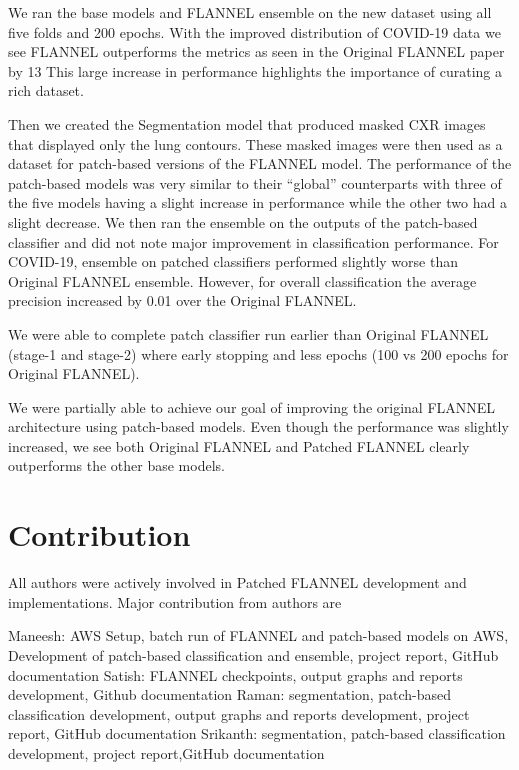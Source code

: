 \documentclass{sigkddExp}
\begin{document}
We ran the base models and FLANNEL ensemble on the new dataset using all five
folds and 200 epochs. With the improved distribution of COVID-19 data we see
FLANNEL outperforms the metrics as seen in the Original FLANNEL paper by 13%
This large increase in performance highlights the importance of curating a rich
dataset.

Then we created the Segmentation model that produced masked CXR images that
displayed only the lung contours. These masked images were then used as a
dataset for patch-based versions of the FLANNEL model. The performance of the
patch-based models was very similar to their “global” counterparts with three of
the five models having a slight increase in performance while the other two had
a slight decrease. We then ran the ensemble on the outputs of the patch-based
classifier and did not note major improvement in classification performance. For
COVID-19, ensemble on patched classifiers performed slightly worse than Original
FLANNEL ensemble. However, for overall classification the average precision
increased by 0.01 over the Original FLANNEL.

We were able to complete patch classifier run earlier than Original FLANNEL
(stage-1 and stage-2) where early stopping and less epochs (100 vs 200 epochs
for Original FLANNEL).

We were partially able to achieve our goal of improving the original FLANNEL
architecture using patch-based models. Even though the performance was slightly
increased, we see both Original FLANNEL and Patched FLANNEL clearly outperforms
the other base models. 



\section{Contribution}

All authors were actively involved in Patched FLANNEL development and implementations. Major contribution from authors are

Maneesh: AWS Setup, batch run of FLANNEL and patch-based models on AWS, Development of patch-based classification and ensemble, project report, GitHub documentation
Satish: FLANNEL checkpoints, output graphs and reports development, Github documentation
Raman: segmentation, patch-based classification development, output graphs and reports development, project report, GitHub documentation
Srikanth:  segmentation, patch-based classification development, project report,GitHub documentation
\end{document}
